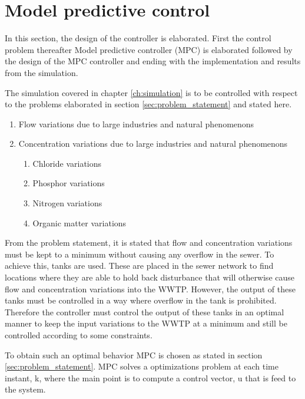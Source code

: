 \section{Model predictive control}\label{se:model_predictive_control}
In this section, the design of the controller is elaborated. First the control problem thereafter Model predictive controller (MPC) is elaborated followed by the design of the MPC controller and ending with the implementation and results from the simulation. 

The simulation covered in chapter \ref{ch:simulation} is to be controlled with respect to the problems elaborated in section \ref{sec:problem_statement} and stated here. 
\begin{enumerate}
\item Flow variations due to large industries and natural phenomenons
\item Concentration variations due to large industries and natural phenomenons
\begin{enumerate}
	\item Chloride variations
	\item Phosphor variations
	\item Nitrogen variations
	\item Organic matter variations
\end{enumerate}
\end{enumerate}

From the problem statement, it is stated that flow and concentration variations must be kept to a minimum without causing any overflow in the sewer. To achieve this, tanks are used. These are placed in the sewer network to find locations where they are able to hold back disturbance that will otherwise cause flow and concentration variations into the WWTP. However, the output of these tanks must be controlled in a way where overflow in the tank is prohibited. Therefore the controller must control the output of these tanks in an optimal manner to keep the input variations to the WWTP at a minimum and still be controlled according to some constraints.

To obtain such an optimal behavior MPC is chosen as stated in section \ref{sec:problem_statement}. MPC solves a optimizations problem at each time instant, k, where the main point is to compute a control vector, u that is feed to the system. 

